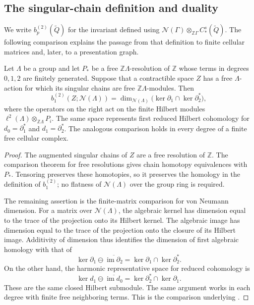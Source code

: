 \subsection{The singular-chain definition and duality}

We write $b_p^{(2)}(\widetilde Q)$ for the invariant defined using
$\mathcal N(\Gamma)\otimes_{\mathbb Z\Gamma}C_*^s(\widetilde Q)$.
The following comparison explains the passage from that definition to
finite cellular matrices and, later, to a presentation graph.

\begin{lemma}\label{found:comparison}
Let $\Lambda$ be a group and let $P_*$ be a free
$\mathbb Z\Lambda$-resolution of $\mathbb Z$ whose terms in degrees
$0,1,2$ are finitely generated. Suppose that a contractible space $Z$
has a free $\Lambda$-action for which its singular chains are free
$\mathbb Z\Lambda$-modules. Then
\[
 b_1^{(2)}(Z;\mathcal N(\Lambda))
 =\dim_{\mathcal N(\Lambda)}
   \bigl(\ker\partial_1\cap\ker\partial_2^*\bigr),
\]
where the operators on the right act on the finite Hilbert modules
$\ell^2(\Lambda)\otimes_{\mathbb Z\Lambda}P_i$.
The same space represents first reduced Hilbert cohomology for
$d_0=\partial_1^*$ and $d_1=\partial_2^*$.
The analogous comparison holds in every degree of a finite free
cellular complex.
\end{lemma}

\begin{proof}
The augmented singular chains of $Z$ are a free resolution of
$\mathbb Z$. The comparison theorem for free resolutions gives chain
homotopy equivalences with $P_*$.
Tensoring preserves these homotopies, so it preserves the homology in
the definition of $b_1^{(2)}$; no flatness of $\mathcal N(\Lambda)$
over the group ring is required.

The remaining assertion is the finite-matrix comparison for von
Neumann dimension. For a matrix over $\mathcal N(\Lambda)$, the
algebraic kernel has dimension equal to the trace of the projection
onto its Hilbert kernel. The algebraic image has dimension equal to
the trace of the projection onto the closure of its Hilbert image.
Additivity of dimension thus identifies the dimension of first
algebraic homology with that of
\[
 \ker\partial_1\ominus\overline{\operatorname{im}\partial_2}
 =\ker\partial_1\cap\ker\partial_2^*.
\]
On the other hand, the harmonic representative space for reduced
cohomology is
\[
 \ker d_1\ominus\overline{\operatorname{im}d_0}
 =\ker\partial_2^*\cap\ker\partial_1.
\]
These are the same closed Hilbert submodule. The same argument works
in each degree with finite free neighboring terms. This is the
comparison underlying \cite[Remark~1.31 and Lemmas~6.51--6.53]{Luck2002}.
\end{proof}

